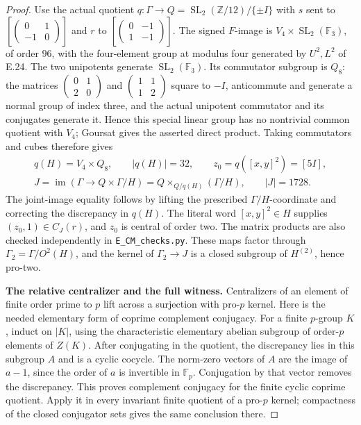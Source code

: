 \begin{proof}
Use the actual quotient
$q:\Gamma\to Q=\operatorname{SL}_2(\mathbb Z/12)/\{\pm I\}$
with $s$ sent to
$[\left(\begin{smallmatrix}0&1\\-1&0\end{smallmatrix}\right)]$
and $r$ to
$[\left(\begin{smallmatrix}0&-1\\1&-1\end{smallmatrix}\right)]$.
The signed $F$-image is $V_4\times\operatorname{SL}_2(\mathbb F_3)$,
of order $96$, with the four-element group at
modulus four generated by $U^2,L^2$ of E.24.
The two unipotents generate $\operatorname{SL}_2(\mathbb F_3)$.
Its commutator subgroup is $Q_8$: the matrices
$\left(\begin{smallmatrix}0&1\\2&0\end{smallmatrix}\right)$
and $\left(\begin{smallmatrix}1&1\\1&2\end{smallmatrix}\right)$
square to $-I$, anticommute and generate a
normal group of index three, and the actual
unipotent commutator and its conjugates
generate it. Hence this special linear group
has no nontrivial common quotient with $V_4$;
Goursat gives the asserted direct product.
Taking commutators and cubes therefore gives
\[
 \begin{gathered}
 q(H)=V_4\times Q_8,\qquad |q(H)|=32,\qquad
 z_0=q([x,y]^2)=[5I],\\
 J=\operatorname{im}(\Gamma\to Q\times\Gamma/H)
   =Q\times_{Q/q(H)}(\Gamma/H),\qquad |J|=1728.
 \end{gathered}                                                   \tag{E.237}
\]
The joint-image equality follows by lifting
the prescribed $\Gamma/H$-coordinate and
correcting the discrepancy in $q(H)$.
The literal word $[x,y]^2\in H$ supplies
$(z_0,1)\in C_J(r)$, and $z_0$ is central
of order two. The matrix products are also
checked independently in \texttt{E\_CM\_checks.py}.
These maps factor through
$\Gamma_2=\Gamma/O^2(H)$, and the kernel of
$\Gamma_2\to J$ is a closed subgroup of
$H^{(2)}$, hence pro-two.

\medskip\noindent\textbf{The relative centralizer and the full witness.}
Centralizers of an element of finite order
prime to $p$ lift across a surjection with
pro-$p$ kernel. Here is the needed elementary
form of coprime complement conjugacy.
For a finite $p$-group $K$, induct on $|K|$,
using the characteristic elementary abelian
subgroup of order-$p$ elements of $Z(K)$.
After conjugating in the quotient, the
discrepancy lies in this subgroup $A$ and
is a cyclic cocycle. The norm-zero vectors
of $A$ are the image of $a-1$, since the
order of $a$ is invertible in $\mathbb F_p$.
Conjugation by that vector removes the
discrepancy. This proves complement
conjugacy for the finite cyclic coprime
quotient. Apply it in every invariant
finite quotient of a pro-$p$ kernel;
compactness of the closed conjugator sets
gives the same conclusion there.


\end{proof}
